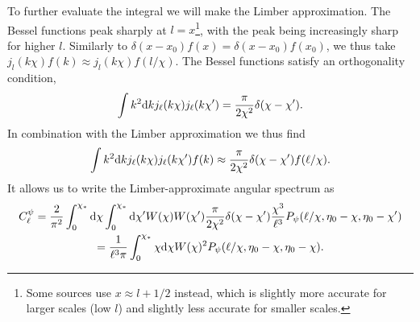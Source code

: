\documentclass[11pt]{article} %
\DeclareRobustCommand{\d}{\ifmmode\text{d}\else d\fi}
\begin{document}
To further evaluate the integral we will make the Limber approximation. The Bessel functions peak sharply at $l=x$\footnote{Some sources use $x\approx l+1/2$ instead, which is slightly more accurate for larger scales (low $l$) and slightly less accurate for smaller scales.}, with the peak being increasingly sharp for higher $l$. Similarly to $\delta(x-x_0)f(x)=\delta(x-x_0)f(x_0)$, we thus take $j_l(k\chi)f(k)\approx j_l(k\chi)f(l/\chi)$. The Bessel functions satisfy an orthogonality condition,
\begin{equation}
    \int k^2\d k j_\ell(k\chi)j_\ell(k\chi') = \frac{\pi}{2\chi^2}\delta(\chi-\chi').
\end{equation}
In combination with the Limber approximation we thus find
\begin{equation}
    \int k^2\d k j_\ell(k\chi)j_\ell(k\chi')f(k) \approx \frac{\pi}{2\chi^2}\delta(\chi-\chi')f(\ell/\chi).
\end{equation}
It allows us to write the Limber-approximate angular spectrum as
\begin{gather}
    C^\psi_{\ell} = \frac{2}{\pi^2}\int_0^{\chi_*}\d \chi\int_0^{\chi_*}\d \chi' W(\chi)W(\chi') \frac{\pi}{2\chi^2}\delta(\chi-\chi')\frac{\chi^3}{\ell^3}P_\psi(\ell/\chi,\eta_0 - \chi, \eta_0-\chi')\\
    = \frac{1}{\ell^3\pi}\int_0^{\chi_*}\chi\d \chi W(\chi)^2 P_\psi(\ell/\chi,\eta_0 - \chi, \eta_0-\chi). \label{eq:lpsintermsofpsi}
\end{gather}
\end{document}
